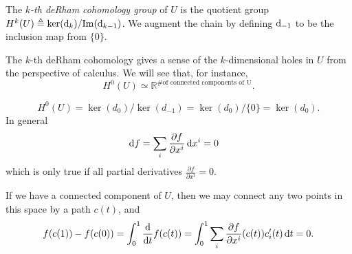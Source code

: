 \begin{defn}
The \emph{$k$-th deRham cohomology group} of $U$ is the quotient group
$H^k(U) \triangleq \ker(\mathop{}\!\mathrm{d}_k) / \mathrm{Im}(\mathop{}\!\mathrm{d}_{k-1})$. We augment
the chain by defining $\mathop{}\!\mathrm{d}_{-1}$ to be the inclusion map from $\{ 0 \}$.
\end{defn}

\begin{remark}
The $k$-th deRham cohomology gives a sense of the $k$-dimensional
holes in $U$ from the perspective of calculus. We will see that, for instance,
$$
H^0(U) \simeq \mathbb{R}^{\text{\# of connected components of U}}.
$$
\end{remark}

\begin{xmpl}
$$
  H^0(U)
= \ker(d_0) / \ker(d_{-1})
= \ker(d_0) / \{ 0 \}
= \ker(d_0).
$$
In general
\begin{align*}
   \mathop{}\!\mathrm{d} f
&= \sum_i
     \frac{\partial f}{\partial x^i}
     \mathop{}\!\mathrm{d} x^i = 0
\end{align*}
which is only true if all partial derivatives
$\frac{\partial f}{\partial x^i} = 0$.

If we have a connected component of $U$, then we may connect any two
points in this space by a path $c(t)$, and
$$
  f(c(1)) - f(c(0))
= \int_0^1 \frac{\mathop{}\!\mathrm{d}}{\mathop{}\!\mathrm{d} t} f(c(t))
= \int_0^1
    \sum_i
      \frac{\partial f}
           {\partial x^i}
      (c(t)) c_i^\prime(t)
      \mathop{}\!\mathrm{d} t
= 0.
$$
\end{xmpl}
